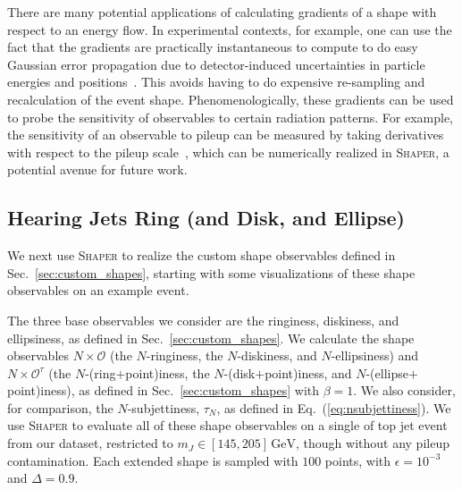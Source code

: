 \documentclass[letterpaper,11pt]{article}
\renewcommand{\O}{\mathcal{O}}
\DeclareRobustCommand{\Sec}[1]{Sec.~\ref{sec:#1}}
\DeclareRobustCommand{\Eq}[1]{Eq.~(\ref{eq:#1})}
\def\GeV{\text{GeV}}
\newcommand{\Shaper}{\textsc{Shaper}\xspace}
\begin{document}
There are many potential applications of calculating gradients of a shape with respect to an energy flow. In experimental contexts, for example, one can use the fact that the gradients are practically instantaneous to compute to do easy Gaussian error propagation due to detector-induced uncertainties in particle energies and positions~\cite{CMS:2016lmd, ATLAS:2020cli}. This avoids having to do expensive re-sampling and recalculation of the event shape. Phenomenologically, these gradients can be used to probe the sensitivity of observables to certain radiation patterns. For example, the sensitivity of an observable to pileup can be measured by taking derivatives with respect to the pileup scale~\cite{Soyez:2012hv}, which can be numerically realized in \Shaper, a potential avenue for future work. 



\subsection{Hearing Jets Ring (and Disk, and Ellipse)}\label{sec:jets}


We next use \Shaper to realize the custom shape observables defined in \Sec{custom_shapes}, starting with some visualizations of these shape observables on an example event.

The three base observables we consider are the ringiness, diskiness, and ellipsiness, as defined in \Sec{custom_shapes}. We calculate the shape observables $N\times\O$ (the $N$-ringiness, the $N$-diskiness, and $N$-ellipsiness) and $N\times\O^\tau$ (the $N$-(ring$+$point)iness, the $N$-(disk$+$point)iness, and $N$-(ellipse$+$point)iness), as defined in \Sec{custom_shapes} with $\beta = 1$.
%
We also consider, for comparison, the $N$-subjettiness, $\tau_N$, as defined in \Eq{nsubjettiness}. 
%
We use \Shaper to evaluate all of these shape observables on a single of top jet event from our dataset, restricted to $m_J \in [145, 205]\,\GeV$, though without any pileup contamination. Each extended shape is sampled with $100$ points, with $\epsilon = 10^{-3}$ and $\Delta = 0.9$. 
\end{document}
